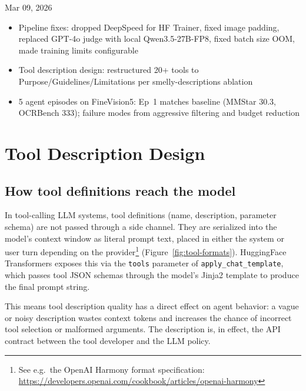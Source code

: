 \meetingheader
    {Mar 09, 2026}
    {}
    {}
    {\begin{itemize}
        \item Pipeline fixes: dropped DeepSpeed for HF Trainer, fixed image padding, replaced GPT-4o judge with local Qwen3.5-27B-FP8, fixed batch size OOM, made training limits configurable
        \item Tool description design: restructured 20+ tools to Purpose/Guidelines/Limitations per smelly-descriptions ablation
        \item 5 agent episodes on FineVision5: Ep~1 matches baseline (MMStar 30.3, OCRBench 333); failure modes from aggressive filtering and budget reduction
    \end{itemize}}
    {}




\newpage
\section{Tool Description Design}

\subsection{How tool definitions reach the model}

In tool-calling LLM systems, tool definitions (name, description, parameter schema) are not passed through a side channel. They are serialized into the model's context window as literal prompt text, placed in either the system or user turn depending on the provider\footnote{See e.g.\ the OpenAI Harmony format specification: \url{https://developers.openai.com/cookbook/articles/openai-harmony}} (Figure~\ref{fig:tool-formats}). HuggingFace Transformers exposes this via the \texttt{tools} parameter of \texttt{apply\_chat\_template}, which passes tool JSON schemas through the model's Jinja2 template to produce the final prompt string.

This means tool description quality has a direct effect on agent behavior: a vague or noisy description wastes context tokens and increases the chance of incorrect tool selection or malformed arguments. The description is, in effect, the API contract between the tool developer and the LLM policy.

